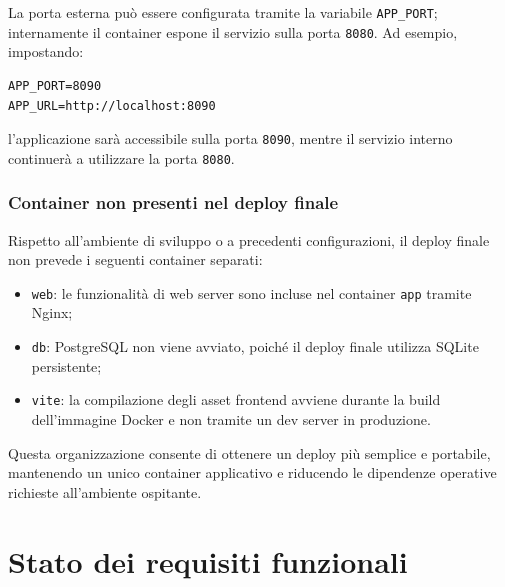 \documentclass[a4paper,10pt]{article}
\begin{document}
La porta esterna può essere configurata tramite la variabile \texttt{APP\_PORT}; internamente il container espone il servizio sulla porta \texttt{8080}. Ad esempio, impostando:

\begin{lstlisting}
APP_PORT=8090
APP_URL=http://localhost:8090
\end{lstlisting}

l'applicazione sarà accessibile sulla porta \texttt{8090}, mentre il servizio interno continuerà a utilizzare la porta \texttt{8080}.

\subsubsection{Container non presenti nel deploy finale}
Rispetto all'ambiente di sviluppo o a precedenti configurazioni, il deploy finale non prevede i seguenti container separati:

\begin{itemize}
    \item \texttt{web}: le funzionalità di web server sono incluse nel container \texttt{app} tramite Nginx;
    \item \texttt{db}: PostgreSQL non viene avviato, poiché il deploy finale utilizza SQLite persistente;
    \item \texttt{vite}: la compilazione degli asset frontend avviene durante la build dell'immagine Docker e non tramite un dev server in produzione.
\end{itemize}

Questa organizzazione consente di ottenere un deploy più semplice e portabile, mantenendo un unico container applicativo e riducendo le dipendenze operative richieste all'ambiente ospitante.

\newpage



\newcommand{\reqF}[2]{%
    \refstepcounter{RF@#1}%
    \stepcounter{reqTotal}%
    \noindent{RF-#1-\arabic{RF@#1}}\quad #2\par
}


\section{Stato dei requisiti funzionali}
    
\end{document}
